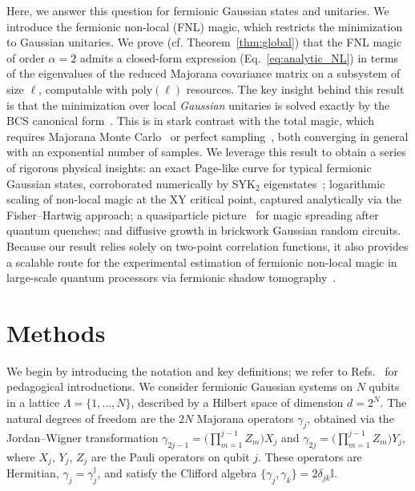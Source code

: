 \documentclass[prx,twocolumn,superscriptaddress,aps,10pt, frontmatterverbose, reprint,footinbib,longbibliography=true]{revtex4-2}
\newcommand{\RENYI}{\alpha}
\begin{document}
Here, we answer this question for fermionic Gaussian states and unitaries. We introduce the fermionic non-local (FNL) magic, which restricts the minimization to Gaussian unitaries. 
We prove (cf. Theorem~\ref{thm:global}) that the FNL magic of order $\RENYI=2$ admits a closed-form expression (Eq.~\eqref{eq:analytic_NL}) in terms of the eigenvalues of the reduced Majorana covariance matrix on a subsystem of size $\ell$, computable with $\mathrm{poly}(\ell)$ resources. 
The key insight behind this result is that the minimization over local \emph{Gaussian} unitaries is solved exactly by the BCS canonical form~\cite{BoteroReznik2004}. 
This is in stark contrast with the total magic, which requires Majorana Monte Carlo~\cite{Bera_2025} or perfect sampling~\cite{collura2026nonstabilizernessfermionicgaussianstates}, both converging in general with an exponential number of samples.
We leverage this result to obtain a series of rigorous physical insights: an exact Page-like curve for typical fermionic Gaussian states, corroborated numerically by SYK$_2$ eigenstates~\cite{Bera_2025,santra2025complexitytransitionschaoticquantum,jasser2025stabilizer, malvimat2026multipartitenonlocalmagicsyk, njgn-fksh}; logarithmic scaling of non-local magic at the XY critical point, captured analytically via the Fisher--Hartwig approach; a quasiparticle picture~\cite{calabrese2009} for magic spreading after quantum quenches; and diffusive growth in brickwork Gaussian random circuits.
Because our result relies solely on two-point correlation functions, it also provides a scalable route for the experimental estimation of fermionic non-local magic in large-scale quantum processors via fermionic shadow tomography~\cite{Wan_2023}.

\section{Methods}
\label{sec:methods}
We begin by introducing the notation and key definitions; we refer to Refs.~\cite{Mbeng2024,surace,sierant2026fermionic,sierant2026theorymatchgatecommutant} for pedagogical introductions.
We consider fermionic Gaussian systems on $N$ qubits in a lattice $\Lambda=\{1,\dots, N\}$, described by a Hilbert space of dimension $d=2^N$.
The natural degrees of freedom are the $2N$ Majorana operators $\gamma_j$, obtained via the Jordan--Wigner transformation $\gamma_{2j-1} = \bigl(\prod_{m=1}^{j-1} Z_m\bigr)X_j$ and $\gamma_{2j} = \bigl(\prod_{m=1}^{j-1} Z_m\bigr)Y_j$, where $X_j$, $Y_j$, $Z_j$ are the Pauli operators on qubit $j$.
These operators are Hermitian, $\gamma_j=\gamma_j^\dagger$, and satisfy the Clifford algebra $\lbrace \gamma_j,\gamma_k\}=2 \delta_{jk} \mathbb{I}$.
\end{document}

